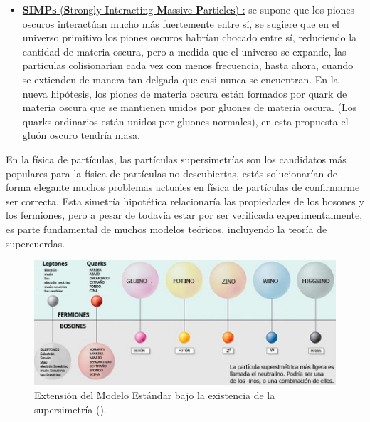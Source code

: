 \begin{itemize}
\item \href{https://es.scribd.com/document/273103231/Dark-Pion-Particles-May-Explain-Universe-s-Invisible-Matter}{\textbf{SIMPs} (\textbf{S}trongly \textbf{I}nteracting \textbf{M}assive \textbf{P}article\textbf{s}) :} se supone que los piones oscuros interactúan mucho más fuertemente entre sí, se sugiere que en el universo primitivo los piones oscuros habrían chocado entre sí, reduciendo la cantidad de materia oscura, pero a medida que el universo se expande, las partículas colisionarían cada vez con menos frecuencia, hasta ahora, cuando se extienden de manera tan delgada que casi nunca se encuentran. En la nueva hipótesis, los piones de materia oscura están formados por quark de materia oscura que se mantienen unidos por gluones de materia oscura. (Los quarks ordinarios están unidos por gluones normales), en esta propuesta el gluón oscuro tendría masa.
\end{itemize}

En la física de partículas, las partículas supersimetrías son los candidatos más populares para la física de partículas no descubiertas, estás solucionarían de forma elegante muchos problemas actuales en física de partículas de confirmarme ser correcta. Esta simetría hipotética relacionaría las propiedades de los bosones y los fermiones, pero a pesar de todavía estar por ser verificada experimentalmente, es parte fundamental de muchos modelos teóricos, incluyendo la teoría de supercuerdas. 
\begin{figure}[h!]
\centering
\includegraphics[width=.9\textwidth]{Analisis_y_Resultados/imagenes/supersimetrias.png}
\caption{Extensión del Modelo Estándar bajo la existencia de la supersimetría (\SUSY). %
}
\label{susy}
\end{figure}

